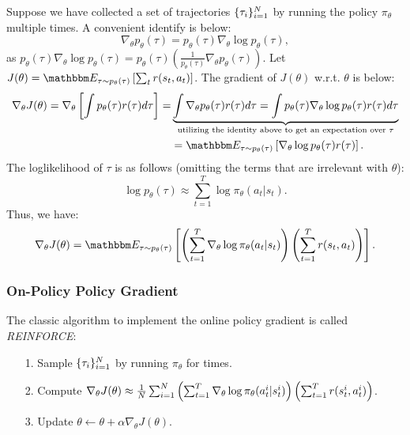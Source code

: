 Suppose we have collected a set of trajectories $\{ \tau_i \}_{i=1}^{N}$ by running the policy $\pi_{\theta}$ multiple times.
A convenient identify is below:
    \begin{equation}
        \nabla_\theta p_\theta(\tau) = p_{\theta}(\tau)\nabla_{\theta}\log p_{\theta}(\tau),
    \end{equation}
as $p_{\theta}(\tau)\nabla_{\theta}\log p_{\theta}(\tau) = p_\theta(\tau) \left( \frac{1}{p_\theta(\tau)} \nabla_\theta p_\theta(\tau) \right)$.
Let $J(\theta) = \E_{\tau \sim p_\theta(\tau)}\left[ \sum_{t}^{}{r(s_t, a_t)} \right]$.
The gradient of $J(\theta)$ w.r.t. $\theta$ is below:
    \begin{equation}
        \begin{aligned}
         \nabla_\theta J(\theta) = \nabla_\theta \left[ \int p_\theta(\tau) r(\tau) d\tau \right] = & \underbrace{ \int \nabla_\theta p_\theta(\tau) r(\tau) d\tau    = \int p_{\theta}(\tau)\nabla_{\theta}\log p_{\theta}(\tau)  r(\tau) d\tau }_{\text{utilizing the identity above to get an expectation over $\tau$}} \\
         & = \E_{\tau \sim p_\theta(\tau)} \left[ \nabla_\theta \log p_\theta(\tau) r(\tau) \right].
        \end{aligned}
    \end{equation}
The loglikelihood of $\tau$ is as follows (omitting the terms that are irrelevant with $\theta$):
    \begin{equation}
        \log p_\theta(\tau) \approx \sum_{t=1}^{T}{\log \pi_{\theta}(a_t | s_t)}.
    \end{equation}
Thus, we have:
    \begin{equation}
        \nabla_\theta J(\theta) = \E_{\tau \sim p_\theta(\tau)}\left[ \left( \sum_{t=1}^{T}{\nabla_\theta \log\pi_{\theta}(a_t | s_t)}\right) \left( \sum_{t=1}^{T}{r(s_t, a_t)} \right)\right].
    \end{equation}
    
\subsubsection{On-Policy Policy Gradient}
The classic algorithm to implement the online policy gradient is called \emph{REINFORCE}:
    \begin{itemize}
        \item[1.] Sample $\{ \tau_i \}_{i=1}^{N}$ by running $\pi_{\theta}$ for \ndata times.
        \item[2.] Compute $\nabla_\theta J(\theta) \approx \frac{1}{N}\sum_{i=1}^{N}{
        \left(\sum_{t=1}^{T}{\nabla_\theta\log \pi_\theta(a_t^i | s_t^i)}\right)
        \left(\sum_{t=1}^{T}{r(s_t^i, a_t^i)} \right)
        }$.
        \item[3.] Update $\theta \leftarrow \theta + \alpha \nabla_\theta J(\theta)$.
    \end{itemize}
    
